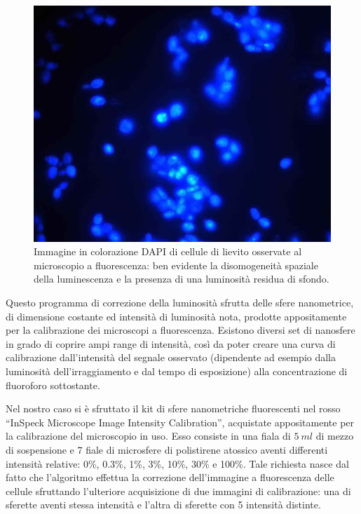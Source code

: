 \begin{figure}
 \centering
 \includegraphics[scale=.55]{img/CAP3bordi.jpg}
 \caption{\small{Immagine in colorazione DAPI di cellule di lievito osservate al microscopio a fluorescenza: ben evidente la disomogeneità spaziale della luminescenza e la presenza di una luminosità residua di sfondo.}}
 \label{fig:bordi}
\end{figure}

Questo programma di correzione della luminosità sfrutta delle sfere nanometrice, di dimensione costante ed intensità di luminosità nota, prodotte appositamente per la calibrazione dei microscopi a fluorescenza.
Esistono diversi set di nanosfere in grado di coprire ampi range di intensità, così da poter creare una curva di calibrazione dall'intensità del segnale osservato (dipendente ad esempio dalla luminosità dell'irraggiamento e dal tempo di esposizione) alla concentrazione di fluoroforo sottostante.
 
Nel nostro caso si è sfruttato il kit di sfere nanometriche fluorescenti nel rosso ``InSpeck Microscope Image Intensity Calibration'', acquistate appositamente per la calibrazione del microscopio in uso.
Esso consiste in una fiala di $5\ ml$ di mezzo di sospensione e 7 fiale di microsfere di polistirene atossico aventi differenti intensità relative: 0\%, 0.3\%, 1\%, 3\%, 10\%, 30\% e 100\%.
Tale richiesta nasce dal fatto che l'algoritmo effettua la correzione dell'immagine a fluorescenza delle cellule sfruttando l'ulteriore acquisizione di due immagini di calibrazione: una di sferette aventi stessa intensità e l'altra di sferette con 5 intensità distinte.

